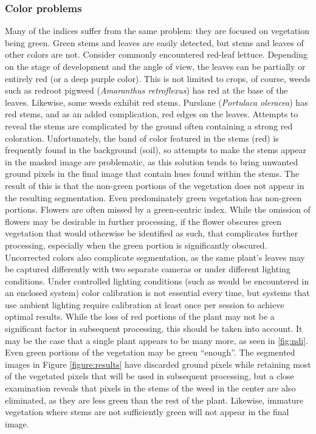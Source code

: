 \documentclass[agriculture,article,submit,pdftex,moreauthors]{Definitions/mdpi}
\begin{document}
\subsubsection{Color problems}
\label{section:problems-color}
Many of the indices suffer from the same problem: they are focused on vegetation being green. Green stems and leaves are easily detected, but stems and leaves of other colors are not. Consider commonly encountered red-leaf lettuce. Depending on the stage of development and the angle of view, the leaves can be partially or entirely red (or a deep purple color). This is not limited to crops, of course, weeds such as redroot pigweed (\textit{Amaranthus retroflexus}) has red at the base of the leaves. Likewise, some weeds exhibit red stems. Purslane (\textit{Portulaca oleracea}) has red stems, and as an added complication, red edges on the leaves. Attempts to reveal the stems are complicated by the ground often containing a strong red coloration. Unfortunately, the band of color featured in the stems (red) is frequently found in the background (soil), so attempts to make the stems appear in the masked image are problematic, as this solution tends to bring unwanted ground pixels in the final image that contain hues found within the stems. The result of this is that the non-green portions of the vegetation does not appear in the resulting segmentation.  Even predominately green vegetation has non-green portions. Flowers are often missed by a green-centric index. While the omission of flowers may be desirable in further processing, if the flower obscures green vegetation that would otherwise be identified as such, that complicates further processing, especially when the green portion is significantly obscured. Uncorrected colors also complicate segmentation, as the same plant's leaves may be captured differently with two separate cameras or under different lighting conditions. Under controlled lighting conditions (such as would be encountered in an enclosed system) color calibration is not essential every time, but systems that use ambient lighting require calibration at least once per session to achieve optimal results. While the loss of red portions of the plant may not be a significant factor in subsequent processing, this should be taken into account. It may be the case that a single plant appears to be many more, as seen in \ref{fig:ndi}.
Even green portions of the vegetation may be green ``enough''. The segmented images in Figure \ref{figure:results} have discarded ground pixels while retaining most of the vegetated pixels that will be used in subsequent processing, but a close examination reveals that pixels in the stems of the weed in the center are also eliminated, as they are less green than the rest of the plant. Likewise, immature vegetation where stems are not sufficiently green will not appear in the final image.
\end{document}
